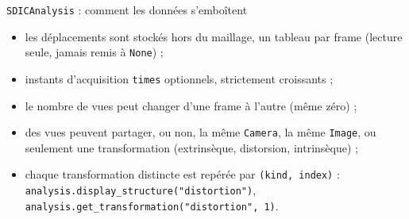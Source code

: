 \documentclass[aspectratio=169,11pt]{beamer}
\newcommand{\code}[1]{\texttt{\small #1}}
\newcommand{\cls}[1]{\textcolor{pyblue}{\texttt{#1}}}
\begin{document}
\begin{frame}{\texttt{SDICAnalysis} : comment les données s'emboîtent}
  \medskip
  \footnotesize
  \begin{itemize}\setlength{\itemsep}{1pt}
    \item les déplacements sont stockés \alert{hors du maillage}, un tableau par frame
          (lecture seule, jamais remis à \code{None}) ;
    \item instants d'acquisition \code{times} optionnels, strictement croissants ;
    \item le \alert{nombre de vues} peut changer d'une frame à l'autre (même zéro) ;
    \item des vues peuvent partager, ou non, la même \cls{Camera}, la même \cls{Image},
          ou seulement une \alert{transformation} (extrinsèque, distorsion, intrinsèque) ;
    \item chaque transformation distincte est repérée par \code{(kind, index)} :
          \code{analysis.display\_structure("distortion")},
          \code{analysis.get\_transformation("distortion", 1)}.
  \end{itemize}
\end{frame}
\end{document}
